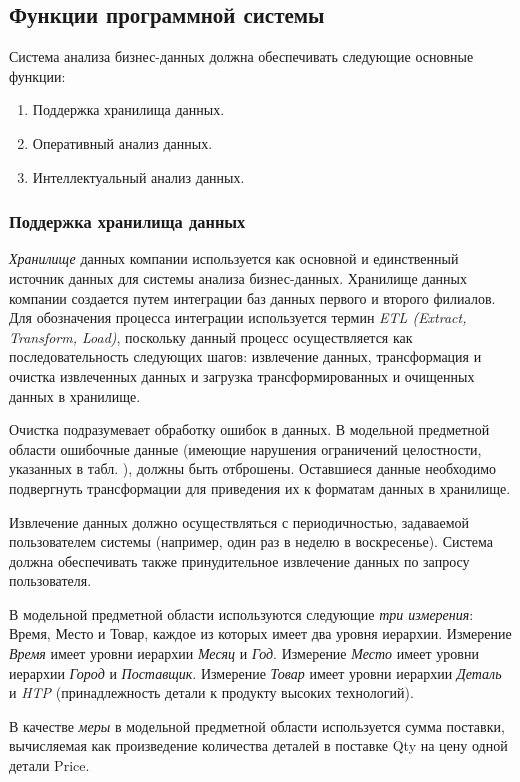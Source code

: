\subsection{Функции программной системы}
Система анализа бизнес-данных должна обеспечивать следующие основные функции:
\begin{enumerate}
  \item Поддержка хранилища данных.
  \item Оперативный анализ данных.
  \item Интеллектуальный анализ данных.
\end{enumerate}

\subsubsection{Поддержка хранилища данных}
\textit{Хранилище} данных компании используется как основной и единственный 
источник данных для системы анализа бизнес-данных. Хранилище данных компании 
создается путем интеграции баз данных первого и второго филиалов. Для 
обозначения процесса интеграции используется термин \textit{ETL (Extract, 
Transform, Load)}, поскольку данный процесс осуществляется как 
последовательность следующих шагов: извлечение данных, трансформация и очистка 
извлеченных данных и загрузка трансформированных и очищенных данных в хранилище. 
\par
Очистка подразумевает обработку ошибок в данных. В модельной предметной области 
ошибочные данные (имеющие нарушения ограничений целостности, указанных в табл. 
), должны быть отброшены. Оставшиеся данные необходимо 
подвергнуть трансформации для приведения их к форматам данных в хранилище.\par
Извлечение данных должно осуществляться с периодичностью, задаваемой 
пользователем системы (например, один раз в неделю в воскресенье). Система 
должна обеспечивать также принудительное извлечение данных по запросу 
пользователя.\par
В модельной предметной области используются следующие \textit{три измерения}: 
Время, Место и Товар, каждое из которых имеет два уровня иерархии. Измерение 
\textit{Время} имеет уровни иерархии \textit{Месяц} и \textit{Год}. Измерение 
\textit{Место} имеет уровни иерархии \textit{Город} и \textit{Поставщик}. 
Измерение \textit{Товар} имеет уровни иерархии \textit{Деталь} и \textit{HTP} 
(принадлежность детали к продукту высоких технологий).\par
В качестве \textit{меры} в модельной предметной области используется сумма 
поставки, вычисляемая как произведение количества деталей в поставке Qty на цену 
одной детали Price.\par

